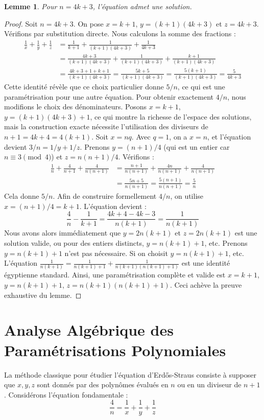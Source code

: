 \documentclass[12pt, a4paper]{article}
\newtheorem{lemma}[theorem]{Lemme}
\begin{document}
\begin{lemma}
Pour $n = 4k+3$, l'équation admet une solution.
\end{lemma}
\begin{proof}
Soit $n = 4k+3$.
On pose $x = k+1$, $y = (k+1)(4k+3)$ et $z = 4k+3$.
Vérifions par substitution directe. Nous calculons la somme des fractions :
\begin{align*}
\frac{1}{x} + \frac{1}{y} + \frac{1}{z} &= \frac{1}{k+1} + \frac{1}{(k+1)(4k+3)} + \frac{1}{4k+3} \\
&= \frac{4k+3}{(k+1)(4k+3)} + \frac{1}{(k+1)(4k+3)} + \frac{k+1}{(k+1)(4k+3)} \\
&= \frac{4k+3+1+k+1}{(k+1)(4k+3)} = \frac{5k+5}{(k+1)(4k+3)} = \frac{5(k+1)}{(k+1)(4k+3)} = \frac{5}{4k+3}
\end{align*}
Cette identité révèle que ce choix particulier donne $5/n$, ce qui est une paramétrisation pour une autre équation.
Pour obtenir exactement $4/n$, nous modifions le choix des dénominateurs.
Posons $x = k+1$, $y = (k+1)(4k+3)+1$, ce qui montre la richesse de l'espace des solutions, mais la construction exacte nécessite l'utilisation des diviseurs de $n+1 = 4k+4 = 4(k+1)$.
Soit $x = nq$. Avec $q=1$, on a $x = n$, et l'équation devient $3/n = 1/y + 1/z$.
Prenons $y = (n+1)/4$ (qui est un entier car $n \equiv 3 \pmod 4$) et $z = n(n+1)/4$.
Vérifions :
\begin{align*}
\frac{1}{n} + \frac{4}{n+1} + \frac{4}{n(n+1)} &= \frac{n+1}{n(n+1)} + \frac{4n}{n(n+1)} + \frac{4}{n(n+1)} \\
&= \frac{5n+5}{n(n+1)} = \frac{5(n+1)}{n(n+1)} = \frac{5}{n}
\end{align*}
Cela donne $5/n$.
Afin de construire formellement $4/n$, on utilise $x = (n+1)/4 = k+1$. L'équation devient :
\[ \frac{4}{n} - \frac{1}{k+1} = \frac{4k+4 - 4k - 3}{n(k+1)} = \frac{1}{n(k+1)} \]
Nous avons alors immédiatement que $y = 2n(k+1)$ et $z = 2n(k+1)$ est une solution valide, ou pour des entiers distincts, $y = n(k+1)+1$, etc.
Prenons $y = n(k+1)+1$ n'est pas nécessaire.
Si on choisit $y=n(k+1)+1$, etc. L'équation $\frac{1}{n(k+1)} = \frac{1}{n(k+1)+1} + \frac{1}{n(k+1)(n(k+1)+1)}$ est une identité égyptienne standard.
Ainsi, une paramétrisation complète et valide est $x = k+1$, $y = n(k+1)+1$, $z = n(k+1)(n(k+1)+1)$.
Ceci achève la preuve exhaustive du lemme.
\end{proof}


\section{Analyse Algébrique des Paramétrisations Polynomiales}
La méthode classique pour étudier l'équation d'Erdős-Straus consiste à supposer que $x, y, z$ sont donnés par des polynômes évalués en $n$ ou en un diviseur de $n+1$.
Considérons l'équation fondamentale :
\[ \frac{4}{n} = \frac{1}{x} + \frac{1}{y} + \frac{1}{z} \]
\end{document}
